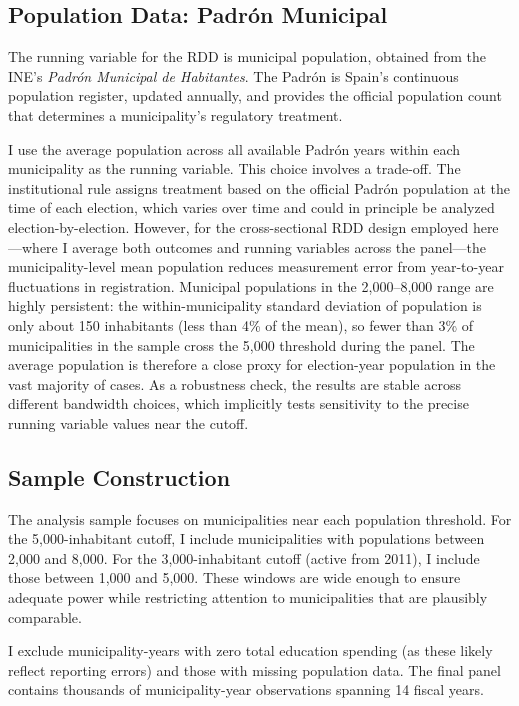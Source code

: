 \documentclass[12pt]{article}
\begin{document}
\subsection{Population Data: Padr\'{o}n Municipal}

The running variable for the RDD is municipal population, obtained from the INE's \emph{Padr\'{o}n Municipal de Habitantes}. The Padr\'{o}n is Spain's continuous population register, updated annually, and provides the official population count that determines a municipality's regulatory treatment.

I use the average population across all available Padr\'{o}n years within each municipality as the running variable. This choice involves a trade-off. The institutional rule assigns treatment based on the official Padr\'{o}n population at the time of each election, which varies over time and could in principle be analyzed election-by-election. However, for the cross-sectional RDD design employed here---where I average both outcomes and running variables across the panel---the municipality-level mean population reduces measurement error from year-to-year fluctuations in registration. Municipal populations in the 2,000--8,000 range are highly persistent: the within-municipality standard deviation of population is only about 150 inhabitants (less than 4\% of the mean), so fewer than 3\% of municipalities in the sample cross the 5,000 threshold during the panel. The average population is therefore a close proxy for election-year population in the vast majority of cases. As a robustness check, the results are stable across different bandwidth choices, which implicitly tests sensitivity to the precise running variable values near the cutoff.

\subsection{Sample Construction}

The analysis sample focuses on municipalities near each population threshold. For the 5,000-inhabitant cutoff, I include municipalities with populations between 2,000 and 8,000. For the 3,000-inhabitant cutoff (active from 2011), I include those between 1,000 and 5,000. These windows are wide enough to ensure adequate power while restricting attention to municipalities that are plausibly comparable.

I exclude municipality-years with zero total education spending (as these likely reflect reporting errors) and those with missing population data. The final panel contains thousands of municipality-year observations spanning 14 fiscal years.
\end{document}
